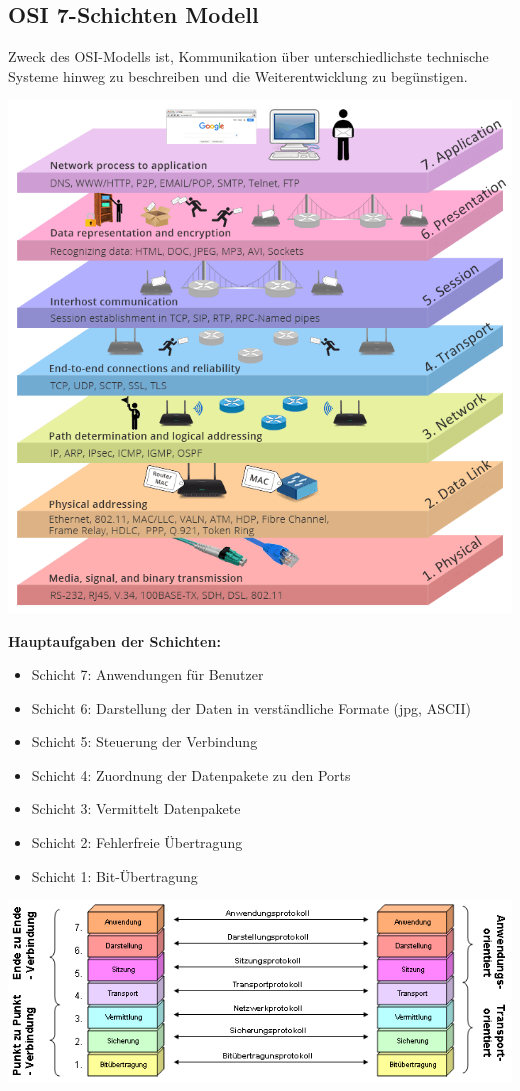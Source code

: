 \documentclass[12pt,a4paper]{article}
\begin{document}
\subsection{OSI 7-Schichten Modell}
Zweck des OSI-Modells ist, Kommunikation über unterschiedlichste technische Systeme hinweg zu beschreiben und die Weiterentwicklung zu begünstigen.\newline\newline
\begin{minipage}{.5\textwidth}
\includegraphics[scale=.45]{Bilder/OSI-Modell1}
\end{minipage}
\begin{minipage}{.5\textwidth}
\textbf{Hauptaufgaben der Schichten:}
\begin{itemize}
\item Schicht 7: Anwendungen für Benutzer
\item Schicht 6: Darstellung der Daten in verständliche Formate (jpg, ASCII)
\item Schicht 5: Steuerung der Verbindung
\item Schicht 4: Zuordnung der Datenpakete zu den Ports
\item Schicht 3: Vermittelt Datenpakete
\item Schicht 2: Fehlerfreie Übertragung
\item Schicht 1: Bit-Übertragung 
\end{itemize}
\end{minipage}
\includegraphics[scale=.75]{Bilder/OSI-Modell2}
\end{document}
